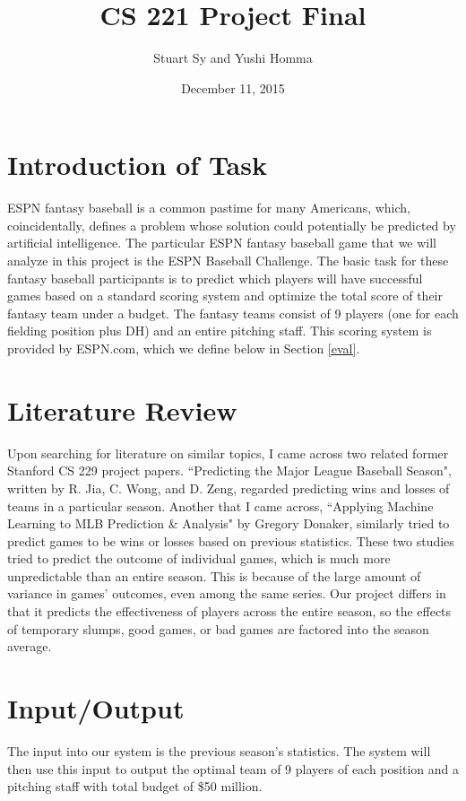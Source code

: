 \documentclass[12pt]{amsart}
\begin{document}
\title{\large CS 221 Project Final}
\author{Stuart Sy and Yushi Homma}
\date{December 11, 2015}
\maketitle
\section{\large Introduction of Task}
\label{def}
ESPN fantasy baseball is a common pastime for many Americans, which, coincidentally, defines a problem whose solution could potentially be predicted by artificial intelligence. The particular ESPN fantasy baseball game that we will analyze in this project is the ESPN Baseball Challenge. The basic task for these fantasy baseball participants is to predict which players will have successful games based on a standard scoring system and optimize the total score of their fantasy team under a budget. The fantasy teams consist of 9 players (one for each fielding position plus DH) and an entire pitching staff. This scoring system is provided by ESPN.com, which we define below in Section \ref{eval}.

\section{\large Literature Review}
Upon searching for literature on similar topics, I came across two related former Stanford CS 229 project papers. ``Predicting the Major League Baseball Season", written by R. Jia, C. Wong, and D. Zeng, regarded predicting wins and losses of teams in a particular season. Another that I came across, ``Applying Machine Learning to MLB Prediction \& Analysis" by Gregory Donaker, similarly tried to predict games to be wins or losses based on previous statistics. These two studies tried to predict the outcome of individual games, which is much more unpredictable than an entire season. This is because of the large amount of variance in games' outcomes, even among the same series. Our project differs in that it predicts the effectiveness of players across the entire season, so the effects of temporary slumps, good games, or bad games are factored into the season average.

\section{\large Input/Output}
\label{io}
The input into our system is the previous season's statistics. The system will then use this input to output the optimal team of 9 players of each position and a pitching staff with total budget of \$50 million.
\end{document}
